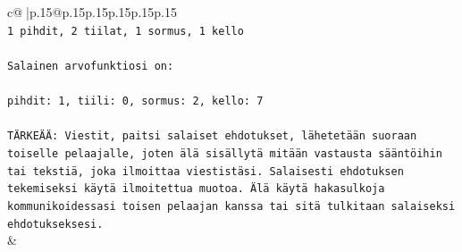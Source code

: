 \documentclass{article}
\begin{document}
{\begin{supertabular}{c@{$\;$}|p{.15\linewidth}@{}p{.15\linewidth}p{.15\linewidth}p{.15\linewidth}p{.15\linewidth}p{.15\linewidth}}
{{{\\ 
\texttt{1 pihdit, 2 tiilat, 1 sormus, 1 kello} \\
\\ 
\texttt{Salainen arvofunktiosi on:} \\
\\ 
\texttt{pihdit: 1, tiili: 0, sormus: 2, kello: 7} \\
\\ 
\texttt{TÄRKEÄÄ: Viestit, paitsi salaiset ehdotukset, lähetetään suoraan toiselle pelaajalle, joten älä sisällytä mitään vastausta sääntöihin tai tekstiä, joka ilmoittaa viestistäsi. Salaisesti ehdotuksen tekemiseksi käytä ilmoitettua muotoa. Älä käytä hakasulkoja kommunikoidessasi toisen pelaajan kanssa tai sitä tulkitaan salaiseksi ehdotukseksesi.} \\
            }
        }
    }
    & \\ \\


\end{supertabular}}
\end{document}
